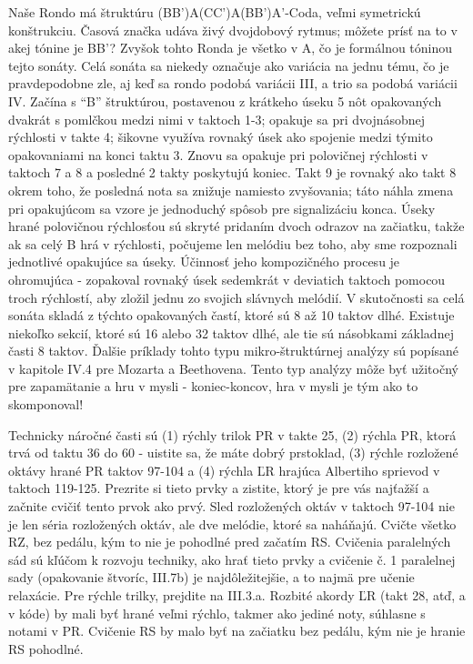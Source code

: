 Naše Rondo má štruktúru (BB’)A(CC’)A(BB’)A’-Coda, veľmi symetrickú konštrukciu. Časová značka udáva  živý dvojdobový rytmus; môžete prísť na to v akej tónine je BB’? Zvyšok tohto Ronda je všetko v A, čo je formálnou tóninou tejto sonáty. Celá sonáta sa niekedy označuje ako variácia na jednu tému, čo je pravdepodobne zle, aj keď sa rondo podobá variácii III, a trio sa podobá variácii IV. Začína s “B” štruktúrou, postavenou z krátkeho úseku 5 nôt opakovaných dvakrát s pomlčkou medzi nimi v taktoch 1-3; opakuje sa pri dvojnásobnej rýchlosti v takte 4; šikovne využíva rovnaký úsek ako spojenie medzi týmito opakovaniami na konci taktu 3. Znovu sa opakuje pri polovičnej rýchlosti v taktoch 7 a 8 a posledné 2 takty poskytujú koniec. Takt 9 je rovnaký ako takt 8 okrem toho, že posledná nota sa znižuje namiesto zvyšovania; táto náhla zmena pri opakujúcom sa vzore je jednoduchý spôsob pre signalizáciu konca. Úseky hrané polovičnou rýchlosťou sú skryté pridaním dvoch odrazov na začiatku, takže ak sa celý B hrá v rýchlosti, počujeme len melódiu bez toho, aby sme rozpoznali jednotlivé opakujúce sa úseky. Účinnosť jeho kompozičného procesu je ohromujúca - zopakoval rovnaký úsek sedemkrát v deviatich taktoch pomocou troch rýchlostí, aby zložil jednu zo svojich slávnych melódií. V skutočnosti sa celá sonáta skladá z týchto opakovaných častí, ktoré sú 8 až 10 taktov dlhé. Existuje niekoľko sekcií, ktoré sú 16 alebo 32 taktov dlhé, ale tie sú násobkami základnej časti 8 taktov. Ďalšie príklady tohto typu mikro-štruktúrnej analýzy sú popísané v kapitole IV.4 pre Mozarta a Beethovena. Tento typ analýzy môže byť užitočný pre zapamätanie a hru v mysli - koniec-koncov, hra v mysli je tým ako to skomponoval!

Technicky náročné časti sú (1) rýchly trilok PR v takte 25, (2) rýchla PR, ktorá trvá od taktu 36 do 60 - uistite sa, že máte dobrý prstoklad, (3) rýchle rozložené oktávy hrané PR taktov 97-104 a (4) rýchla ĽR hrajúca Albertiho sprievod v taktoch 119-125. Prezrite si tieto prvky a zistite, ktorý je pre vás najťažší a začnite cvičiť tento prvok ako prvý. Sled rozložených oktáv v taktoch 97-104 nie je len séria rozložených oktáv, ale dve melódie, ktoré sa naháňajú. Cvičte všetko RZ, bez pedálu, kým to nie je pohodlné pred začatím RS. Cvičenia paralelných sád sú kľúčom k rozvoju techniky, ako hrať tieto prvky a cvičenie č. 1 paralelnej sady (opakovanie štvoríc, III.7b) je najdôležitejšie, a to najmä pre učenie relaxácie. Pre rýchle trilky, prejdite na III.3.a. Rozbité akordy ĽR (takt 28, atď, a v kóde) by mali byť hrané veľmi rýchlo, takmer ako jediné noty, súhlasne s notami v PR. Cvičenie RS by malo byť na začiatku bez pedálu, kým nie je hranie RS pohodlné.


